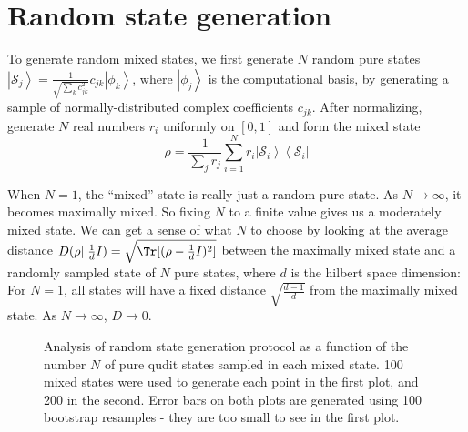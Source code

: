 \documentclass{article}
\begin{document}
\section{Random state generation}

\label{sec:random_state_gen}

To generate random mixed states, we first generate $N$ random pure states $\left|\mathcal S_j\right>=\frac{1}{\sqrt{\sum_k c_{jk}^2}}c_{jk}\left|\phi_k\right>$, where $\left|\phi_j\right>$ is the computational basis, by generating a sample of normally-distributed complex coefficients $c_{jk}$. After normalizing, generate $N$ real numbers $r_i$ uniformly on $[0,1]$ and form the mixed state
\begin{equation}\rho=\frac{1}{\sum_j r_j}\sum_{i=1}^N  r_i\left|\mathcal S_i\right>\left<\mathcal S_i\right|\end{equation}

When $N=1$, the ``mixed'' state is really just a random pure state. As $N\to\infty$, it becomes maximally mixed. So fixing $N$ to a finite value gives us a moderately mixed state. We can get a sense of what $N$ to choose by looking at the average distance $D(\rho || \frac{1}{d} I)=\sqrt{\Tr[(\rho-\frac{1}{d}I)^2]}$ between the maximally mixed state and a randomly sampled state of $N$ pure states, where $d$ is the hilbert space dimension: For $N=1$, all states will have a fixed distance $\sqrt{\frac{d-1}{d}}$ from the maximally mixed state. As $N\to \infty$, $D\to 0$.

\begin{figure}[H]
\centering
{}\hspace{1.5em} 
\caption{Analysis of random state generation protocol as a function of the number $N$ of pure qudit states sampled in each mixed state. 100 mixed states were used to generate each point in the first plot, and 200 in the second. Error bars on both plots are generated using 100 bootstrap resamples - they are too small to see in the first plot.}
\end{figure}
\end{document}
